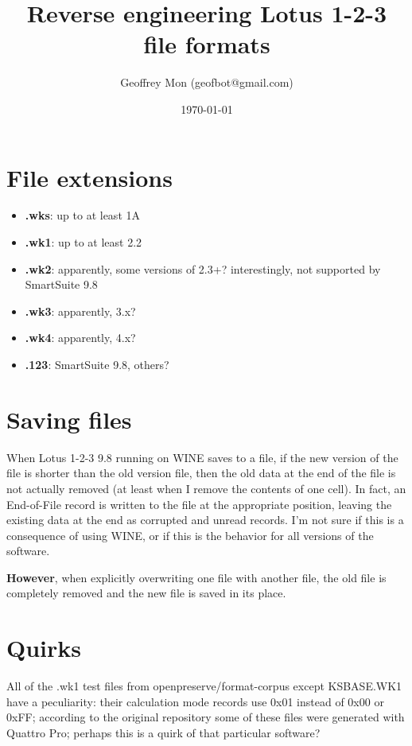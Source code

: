 \documentclass{article}
\title{Reverse engineering Lotus 1-2-3 file formats}
\author{Geoffrey Mon (geofbot@gmail.com)}
\date{\today}
\begin{document}
\maketitle

\section{File extensions}
\begin{itemize}
\item \textbf{.wks}: up to at least 1A
\item \textbf{.wk1}: up to at least 2.2
\item \textbf{.wk2}: apparently, some versions of 2.3+?
  interestingly, not supported by SmartSuite 9.8
\item \textbf{.wk3}: apparently, 3.x?
\item \textbf{.wk4}: apparently, 4.x?
\item \textbf{.123}: SmartSuite 9.8, others?
\end{itemize}

\section{Saving files}
When Lotus 1-2-3 9.8 running on WINE saves to a file, if
the new version of the file is shorter
than the old version file, then the old
data at the end of the file is not actually removed
(at least when I remove the contents of one cell).
In fact, an End-of-File record is written to the file at the
appropriate position, leaving the existing data at the end
as corrupted and unread records.
I'm not sure if this is a consequence of using WINE,
or if this is the behavior for all versions of the software.

\textbf{However}, when explicitly overwriting one file with
another file, the old file is completely removed and
the new file is saved in its place.

\section{Quirks}
All of the .wk1
test files from openpreserve/format-corpus
except KSBASE.WK1 have a peculiarity:
their calculation mode records use 0x01 instead of 0x00 or 0xFF;
according to the original repository some of these
files were generated with Quattro Pro;
perhaps this is a quirk of that particular software?
\end{document}
